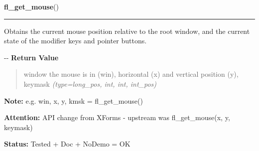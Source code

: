     \label{xformslib:flxbasic:fl_get_mouse}

    \vspace{0.5ex}

\hspace{.8\funcindent}\begin{boxedminipage}{\funcwidth}

    \raggedright \textbf{fl\_get\_mouse}()

    \vspace{-1.5ex}

    \rule{\textwidth}{0.5\fboxrule}
\setlength{\parskip}{2ex}

Obtains the current mouse position relative to the root window, and
the current state of the modifier keys and pointer buttons.

-{}-
\setlength{\parskip}{1ex}
      \textbf{Return Value}
    \vspace{-1ex}

      \begin{quote}

window the mouse is in (win), horizontal (x) and vertical
position (y), keymask
      {\it (type=long\_pos, int, int, int\_pos)}

      \end{quote}

\textbf{Note:} 
e.g. win, x, y, kmsk = fl\_get\_mouse()


\textbf{Attention:} 
API change from XForms - upstream was
fl\_get\_mouse(x, y, keymask)


\textbf{Status:} 
Tested + Doc + NoDemo = OK


    \end{boxedminipage}

    \label{xformslib:flxbasic:fl_set_mouse}

    \vspace{0.5ex}

